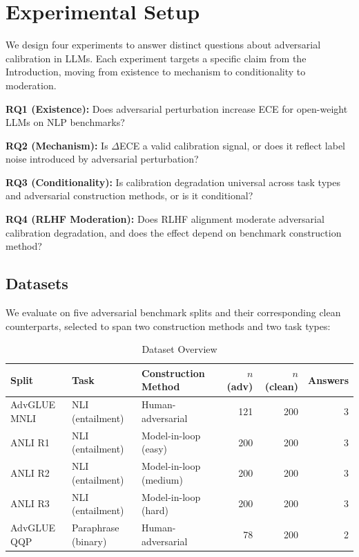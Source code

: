 \section{Experimental Setup}
\label{sec:experiments}

We design four experiments to answer distinct questions about adversarial calibration in LLMs. Each experiment targets a specific claim from the Introduction, moving from existence to mechanism to conditionality to moderation.

\textbf{RQ1 (Existence):} Does adversarial perturbation increase ECE for open-weight LLMs on NLP benchmarks?

\textbf{RQ2 (Mechanism):} Is $\Delta$ECE a valid calibration signal, or does it reflect label noise introduced by adversarial perturbation?

\textbf{RQ3 (Conditionality):} Is calibration degradation universal across task types and adversarial construction methods, or is it conditional?

\textbf{RQ4 (RLHF Moderation):} Does RLHF alignment moderate adversarial calibration degradation, and does the effect depend on benchmark construction method?

\subsection{Datasets}

We evaluate on five adversarial benchmark splits and their corresponding clean counterparts, selected to span two construction methods and two task types:

\begin{table}[h]
\centering
\caption{Dataset Overview}
\label{tab:datasets}
\begin{tabular}{lllrrr}
\toprule
Split & Task & Construction Method & $n$ (adv) & $n$ (clean) & Answers \\
\midrule
AdvGLUE MNLI & NLI (entailment) & Human-adversarial & 121 & 200 & 3 \\
ANLI R1 & NLI (entailment) & Model-in-loop (easy) & 200 & 200 & 3 \\
ANLI R2 & NLI (entailment) & Model-in-loop (medium) & 200 & 200 & 3 \\
ANLI R3 & NLI (entailment) & Model-in-loop (hard) & 200 & 200 & 3 \\
AdvGLUE QQP & Paraphrase (binary) & Human-adversarial & 78 & 200 & 2 \\
\bottomrule
\end{tabular}
\end{table}

